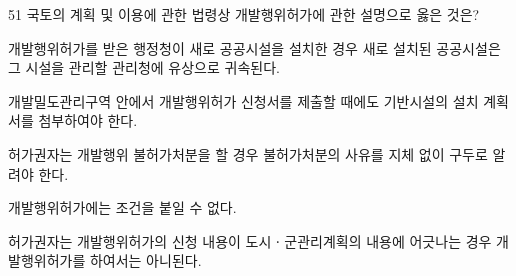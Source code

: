 \begin{question}{51}
국토의 계획 및 이용에 관한 법령상 개발행위허가에 관한 설명으로 옳은 것은?
\begin{choices}
  \item 개발행위허가를 받은 행정청이 새로 공공시설을 설치한 경우 새로 설치된 공공시설은 그 시설을 관리할 관리청에 유상으로 귀속된다.
  \item 개발밀도관리구역 안에서 개발행위허가 신청서를 제출할 때에도 기반시설의 설치 계획서를 첨부하여야 한다.
  \item 허가권자는 개발행위 불허가처분을 할 경우 불허가처분의 사유를 지체 없이 구두로 알려야 한다.
  \item 개발행위허가에는 조건을 붙일 수 없다.
  \item 허가권자는 개발행위허가의 신청 내용이 도시ㆍ군관리계획의 내용에 어긋나는 경우 개발행위허가를 하여서는 아니된다.
\end{choices}
\end{question}
